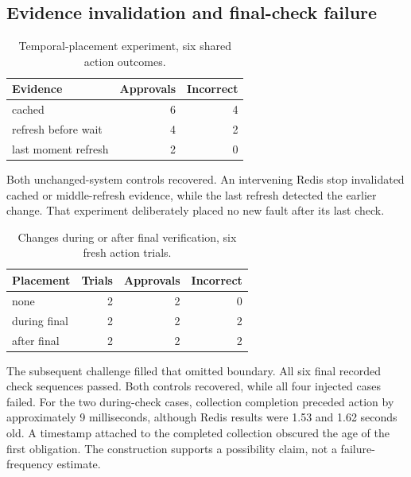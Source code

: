 \documentclass[manuscript,review,nonacm]{acmart}
\begin{document}
\subsection{Evidence invalidation and final-check failure}
\begin{table}[t]
\caption{Temporal-placement experiment, six shared action outcomes.}
\label{tab:evidence-3-3}
\centering
\begin{tabularx}{\linewidth}{@{}Xrr@{}}
\toprule
Evidence & Approvals & Incorrect \\
\midrule
cached & 6 & 4 \\
refresh before wait & 4 & 2 \\
last moment refresh & 2 & 0 \\
\bottomrule
\end{tabularx}
\end{table}
Both unchanged-system controls recovered. An intervening Redis stop invalidated cached or middle-refresh evidence, while the last refresh detected the earlier change. That experiment deliberately placed no new fault after its last check.

\begin{table}[t]
\caption{Changes during or after final verification, six fresh action trials.}
\label{tab:placement-3-4}
\centering
\begin{tabularx}{\linewidth}{@{}Xrrr@{}}
\toprule
Placement & Trials & Approvals & Incorrect \\
\midrule
none & 2 & 2 & 0 \\
during final & 2 & 2 & 2 \\
after final & 2 & 2 & 2 \\
\bottomrule
\end{tabularx}
\end{table}
The subsequent challenge filled that omitted boundary. All six final recorded check sequences passed. Both controls recovered, while all four injected cases failed. For the two during-check cases, collection completion preceded action by approximately 9 milliseconds, although Redis results were 1.53 and 1.62 seconds old. A timestamp attached to the completed collection obscured the age of the first obligation. The construction supports a possibility claim, not a failure-frequency estimate.
\end{document}
